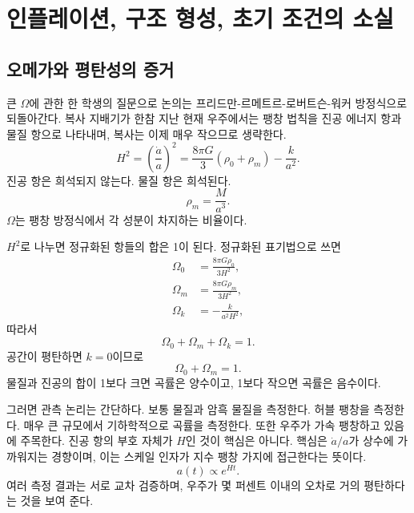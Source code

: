\chapter{인플레이션, 구조 형성, 초기 조건의 소실}

\section{오메가와 평탄성의 증거}

큰 \(\Omega\)에 관한 한 학생의 질문으로 논의는 프리드만-르메트르-로버트슨-워커 방정식으로 되돌아간다. 복사 지배기가 한참 지난 현재 우주에서는 팽창 법칙을 진공 에너지 항과 물질 항으로 나타내며, 복사는 이제 매우 작으므로 생략한다.
\begin{equation}
H^2=\left(\frac{\dot a}{a}\right)^2=\frac{8\pi G}{3}\left(\rho_0+\rho_m\right)-\frac{k}{a^2}.
\end{equation}
진공 항은 희석되지 않는다. 물질 항은 희석된다.
\begin{equation}
\rho_m=\frac{M}{a^3}.
\end{equation}
\(\Omega\)는 팽창 방정식에서 각 성분이 차지하는 비율이다.

\(H^2\)로 나누면 정규화된 항들의 합은 1이 된다. 정규화된 표기법으로 쓰면
\begin{equation}
\begin{aligned}
\Omega_0&=\frac{8\pi G\rho_0}{3H^2},\\
\Omega_m&=\frac{8\pi G\rho_m}{3H^2},\\
\Omega_k&=-\frac{k}{a^2H^2},
\end{aligned}
\end{equation}
따라서
\begin{equation}
\Omega_0+\Omega_m+\Omega_k=1.
\end{equation}
공간이 평탄하면 \(k=0\)이므로
\begin{equation}
\Omega_0+\Omega_m=1.
\end{equation}
물질과 진공의 합이 1보다 크면 곡률은 양수이고, 1보다 작으면 곡률은 음수이다.

그러면 관측 논리는 간단하다. 보통 물질과 암흑 물질을 측정한다. 허블 팽창을 측정한다. 매우 큰 규모에서 기하학적으로 곡률을 측정한다. 또한 우주가 가속 팽창하고 있음에 주목한다. 진공 항의 부호 자체가 \(H\)인 것이 핵심은 아니다. 핵심은 \(\dot a/a\)가 상수에 가까워지는 경향이며, 이는 스케일 인자가 지수 팽창 가지에 접근한다는 뜻이다.
\begin{equation}
a(t)\propto e^{Ht}.
\end{equation}
여러 측정 결과는 서로 교차 검증하며, 우주가 몇 퍼센트 이내의 오차로 거의 평탄하다는 것을 보여 준다.

